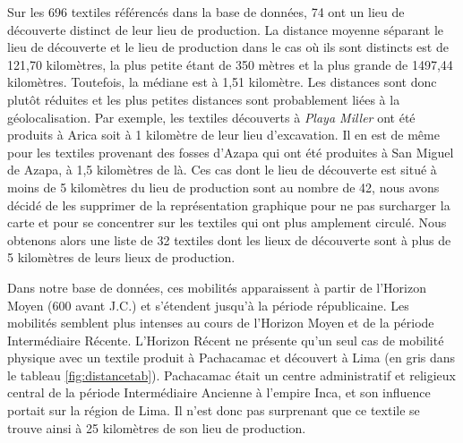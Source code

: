 \noindent Sur les 696 textiles référencés dans la base de données, 74 ont un lieu de découverte distinct de leur lieu de production. La distance moyenne séparant le lieu de découverte et le lieu de production dans le cas où ils sont distincts est de 121,70 kilomètres, la plus petite étant de 350 mètres et la plus grande de 1497,44 kilomètres. Toutefois, la médiane est à 1,51 kilomètre. Les distances sont donc plutôt réduites et les plus petites distances sont probablement liées à la géolocalisation. Par exemple, les textiles découverts à \textit{Playa Miller} ont été produits à Arica soit à 1 kilomètre de leur lieu d'excavation. Il en est de même pour les textiles provenant des fosses d'Azapa qui ont été produites à San Miguel de Azapa, à 1,5 kilomètres de là. Ces cas dont le lieu de découverte est situé à moins de 5 kilomètres du lieu de production sont au nombre de 42, nous avons décidé de les supprimer de la représentation graphique pour ne pas surcharger la carte et pour se concentrer sur les textiles qui ont plus amplement circulé. Nous obtenons alors une liste de 32 textiles dont les lieux de découverte sont à plus de 5 kilomètres de leurs lieux de production.

\noindent Dans notre base de données, ces mobilités apparaissent à partir de l'Horizon Moyen (600 avant J.C.) et s'étendent jusqu'à la période républicaine. Les mobilités semblent plus intenses au cours de l'Horizon Moyen et de la période Intermédiaire Récente. 
L'Horizon Récent ne présente qu'un seul cas de mobilité physique avec un textile produit à Pachacamac et découvert à Lima (en gris dans le tableau \ref{fig:distancetab}). Pachacamac était un centre administratif et religieux central de la période Intermédiaire Ancienne à l'empire Inca, et son influence portait sur la région de Lima. Il n'est donc pas surprenant que ce textile se trouve ainsi à 25 kilomètres de son lieu de production. 

